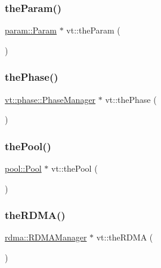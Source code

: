 \mbox{\label{namespacevt_a268431014c9031c0f7c33d32c1b8645c}} 
\subsubsection{\texorpdfstring{the\+Param()}{theParam()}}
{\footnotesize\ttfamily \hyperlink{structvt_1_1param_1_1_param}{param\+::\+Param} $\ast$ vt\+::the\+Param (\begin{DoxyParamCaption}{ }\end{DoxyParamCaption})}

\mbox{\label{namespacevt_a3799d6b51fb71d7b6505760aad457e61}} 
\subsubsection{\texorpdfstring{the\+Phase()}{thePhase()}}
{\footnotesize\ttfamily \hyperlink{structvt_1_1phase_1_1_phase_manager}{vt\+::phase\+::\+Phase\+Manager} $\ast$ vt\+::the\+Phase (\begin{DoxyParamCaption}{ }\end{DoxyParamCaption})}

\mbox{\label{namespacevt_aab3530d89a64e5ea903b0ccf303ecbb7}} 
\subsubsection{\texorpdfstring{the\+Pool()}{thePool()}}
{\footnotesize\ttfamily \hyperlink{structvt_1_1pool_1_1_pool}{pool\+::\+Pool} $\ast$ vt\+::the\+Pool (\begin{DoxyParamCaption}{ }\end{DoxyParamCaption})}

\mbox{\label{namespacevt_a68b8410bc2b86d3b5228d7dbb6b40bac}} 
\subsubsection{\texorpdfstring{the\+R\+D\+M\+A()}{theRDMA()}}
{\footnotesize\ttfamily \hyperlink{structvt_1_1rdma_1_1_r_d_m_a_manager}{rdma\+::\+R\+D\+M\+A\+Manager} $\ast$ vt\+::the\+R\+D\+MA (\begin{DoxyParamCaption}{ }\end{DoxyParamCaption})}

